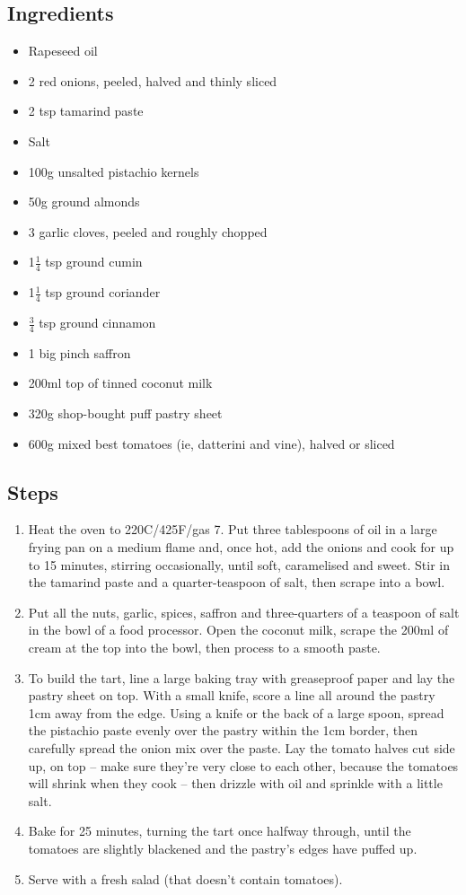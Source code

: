 \documentclass{book}
\begin{document}
\subsection*{Ingredients}
\begin{itemize}
\item Rapeseed oil 
\item 2 red onions, peeled, halved and thinly sliced 
\item 2 tsp tamarind paste 
\item Salt 
\item 100g unsalted pistachio kernels 
\item 50g ground almonds
\item 3 garlic cloves, peeled and roughly chopped 
\item 1$\frac{1}{4}$ tsp ground cumin 
\item 1$\frac{1}{4}$ tsp ground coriander 
\item $\frac{3}{4}$ tsp ground cinnamon 
\item 1 big pinch saffron 
\item 200ml top of tinned coconut milk
\item 320g shop-bought puff pastry sheet
\item 600g mixed best tomatoes (ie, datterini and vine), halved or sliced
\end{itemize}

\subsection*{Steps}
\begin{enumerate}
\item Heat the oven to 220C/425F/gas 7. Put three tablespoons of oil in a large frying pan on a medium flame and, once hot, add the onions and cook for up to 15 minutes, stirring occasionally, until soft, caramelised and sweet. Stir in the tamarind paste and a quarter-teaspoon of salt, then scrape into a bowl.
\item Put all the nuts, garlic, spices, saffron and three-quarters of a teaspoon of salt in the bowl of a food processor. Open the coconut milk, scrape the 200ml of cream at the top into the bowl, then process to a smooth paste.
\item To build the tart, line a large baking tray with greaseproof paper and lay the pastry sheet on top. With a small knife, score a line all around the pastry 1cm away from the edge. Using a knife or the back of a large spoon, spread the pistachio paste evenly over the pastry within the 1cm border, then carefully spread the onion mix over the paste. Lay the tomato halves cut side up, on top – make sure they’re very close to each other, because the tomatoes will shrink when they cook – then drizzle with oil and sprinkle with a little salt.
\item Bake for 25 minutes, turning the tart once halfway through, until the tomatoes are slightly blackened and the pastry’s edges have puffed up.
\item Serve with a fresh salad (that doesn’t contain tomatoes).
\end{enumerate}
\newpage
\end{document}
